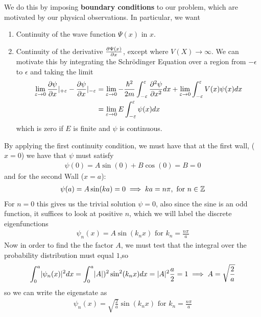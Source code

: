 We do this by imposing \textbf{boundary conditions} to our problem, which are motivated by our physical observations. In particular, we want
\begin{enumerate}
	\item Continuity of the wave function $\Psi(x)$ in $x$.
	\item Continuity of the derivative $\frac{\partial \Psi(x)}{\partial x}$, except where $V(X) \to \infty$. 
		We can motivate this by integrating the Schrödinger Equation over a region from $-\epsilon$ to $\epsilon$ and taking the limit
		\begin{align*}
			\lim_{\varepsilon \to 0} \frac{\partial \psi}{\partial x}|_{+\varepsilon} - \frac{\partial \psi}{\partial x}|_{-\varepsilon} &= \lim_{\varepsilon \to 0} -\frac{\hbar^{2}}{2m} \int_{-\varepsilon}^{\varepsilon} \frac{\partial^2 \psi}{\partial x^2}dx + \lim_{\varepsilon \to 0} \int_{-\varepsilon}^{\varepsilon}V(x) \psi(x) dx\\
																																																					&= \lim_{\varepsilon \to 0} E \int_{-\varepsilon}^{\varepsilon} \psi(x) dx
		\end{align*}
	which is zero if $E$ is finite and $\psi$ is continuous.
\end{enumerate}
By applying the first continuity condition, we must have that at the first wall, ($x = 0$) we have that $\psi$ must satisfy
\begin{align*}
	\psi(0) = A \sin(0) + B \cos(0) = B = 0
\end{align*}
and for the second Wall ($x = a$):
\begin{align*}
	\psi(a) = A \sin(ka) = 0 \implies ka = n\pi, \text{ for } n \in \mathbb{Z}
\end{align*}
For $n = 0$ this gives us the trivial solution $\psi = 0$, also since the sine is an odd function, it suffices to look at positive $n$, which we will label the discrete eigenfunctions
\begin{align*}
	\psi_n(x) = A\sin(k_n x) \text{ for } k_n = \frac{n \pi}{a}	
\end{align*}
Now in order to find the the factor $A$, we must test that the integral over the probability distribution must equal $1$,so
\begin{align*}
	\int_0^{a}\abs{\psi_n(x)}^2 dx = \int_{0}^{a}\abs{A})^2 \sin^2(k_nx)dx = \abs{A}^2 \frac{a}{2} = 1 \implies A = \sqrt{\frac{2}{a}}
\end{align*}
so we can write the eigenstate as
\begin{align*}
	\psi_n(x) = \sqrt{\frac{2}{a}}\sin(k_n x) \text{ for } k_n = \frac{n \pi}{a}	
\end{align*}
